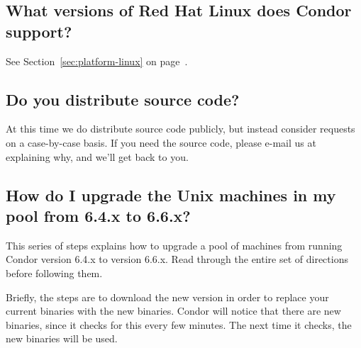 \subsection*{What versions of Red Hat Linux does Condor support?}

See Section~\ref{sec:platform-linux} on
page~\pageref{sec:platform-linux}. 

\subsection*{Do you distribute source code?}

At this time we do  distribute source code publicly, but
instead consider requests on a case-by-case basis.
If you need the source code, please e-mail us at
 explaining why, and we'll get back to
you.


\subsection*{How do I upgrade the Unix machines in my pool from 6.4.x to 6.6.x?}

This series of steps explains how to upgrade a pool of machines
from running Condor version 6.4.x to version 6.6.x.
Read through the entire set of directions before following
them.

Briefly, the steps are to download the new version in
order to replace your current binaries with the new binaries.
Condor will notice that there are new binaries, since
it checks for this every few minutes.
The next time it checks, the new binaries will be used.

